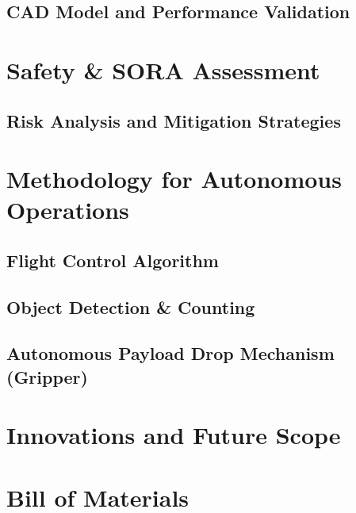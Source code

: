 \documentclass[12pt]{report}
\begin{document}
    \section{CAD Model and Performance Validation}
  \chapter{Safety \& SORA Assessment}
    \section{Risk Analysis and Mitigation Strategies}
      
  \chapter{Methodology for Autonomous Operations}
    \section{Flight Control Algorithm}
    \section{Object Detection \& Counting}
    \section{Autonomous Payload Drop Mechanism (Gripper)}

  \chapter{Innovations and Future Scope}
  \chapter{Bill of Materials}
\end{document}
